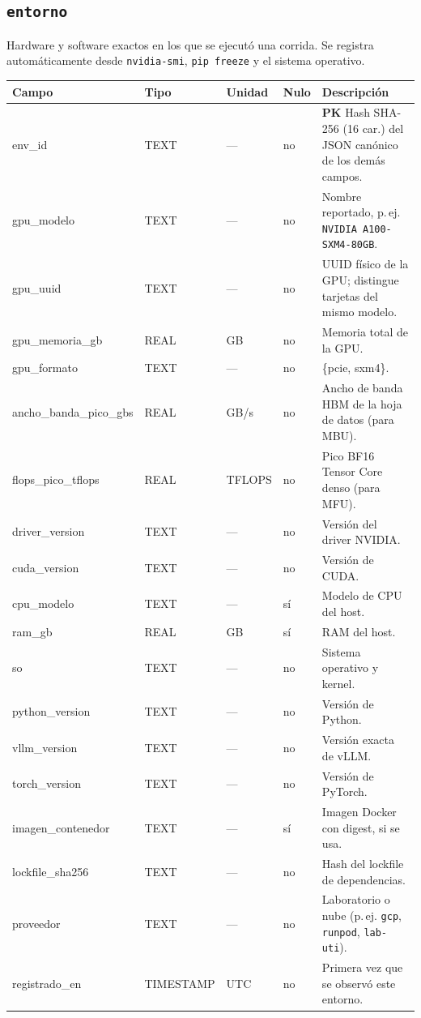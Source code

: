 \documentclass[11pt,a4paper]{article}
\makeatletter
\newcommand{\PK}{\textcolor{pkc}{\textbf{PK}}}
\newenvironment{diccionario}{%
  \small
  \begin{longtable}{@{}>{\raggedright\ttfamily}p{3.4cm}>{\raggedright}p{2.2cm}>{\raggedright}p{1.6cm}p{0.9cm}>{\raggedright\arraybackslash}p{5.8cm}@{}}
  \toprule
  \normalfont\textbf{Campo} & \textbf{Tipo} & \textbf{Unidad} & \textbf{Nulo} & \textbf{Descripción}\\
  \midrule\endhead
  \bottomrule\endfoot
}{\end{longtable}}
\makeatother
\begin{document}
\subsection{\texttt{entorno}}
Hardware y software exactos en los que se ejecutó una corrida. Se registra automáticamente desde \texttt{nvidia-smi}, \texttt{pip freeze} y el sistema operativo.
\begin{diccionario}
env_id & TEXT & — & no & \PK{} Hash SHA-256 (16 car.) del JSON canónico de los demás campos.\\
gpu_modelo & TEXT & — & no & Nombre reportado, p.\,ej. \texttt{NVIDIA A100-SXM4-80GB}.\\
gpu_uuid & TEXT & — & no & UUID físico de la GPU; distingue tarjetas del mismo modelo.\\
gpu_memoria_gb & REAL & GB & no & Memoria total de la GPU.\\
gpu_formato & TEXT & — & no & \{pcie, sxm4\}.\\
ancho_banda_pico_gbs & REAL & GB/s & no & Ancho de banda HBM de la hoja de datos (para MBU).\\
flops_pico_tflops & REAL & TFLOPS & no & Pico BF16 Tensor Core denso (para MFU).\\
driver_version & TEXT & — & no & Versión del driver NVIDIA.\\
cuda_version & TEXT & — & no & Versión de CUDA.\\
cpu_modelo & TEXT & — & sí & Modelo de CPU del host.\\
ram_gb & REAL & GB & sí & RAM del host.\\
so & TEXT & — & no & Sistema operativo y kernel.\\
python_version & TEXT & — & no & Versión de Python.\\
vllm_version & TEXT & — & no & Versión exacta de vLLM.\\
torch_version & TEXT & — & no & Versión de PyTorch.\\
imagen_contenedor & TEXT & — & sí & Imagen Docker con digest, si se usa.\\
lockfile_sha256 & TEXT & — & no & Hash del lockfile de dependencias.\\
proveedor & TEXT & — & no & Laboratorio o nube (p.\,ej. \texttt{gcp}, \texttt{runpod}, \texttt{lab-uti}).\\
registrado_en & TIMESTAMP & UTC & no & Primera vez que se observó este entorno.\\
\end{diccionario}
\end{document}

